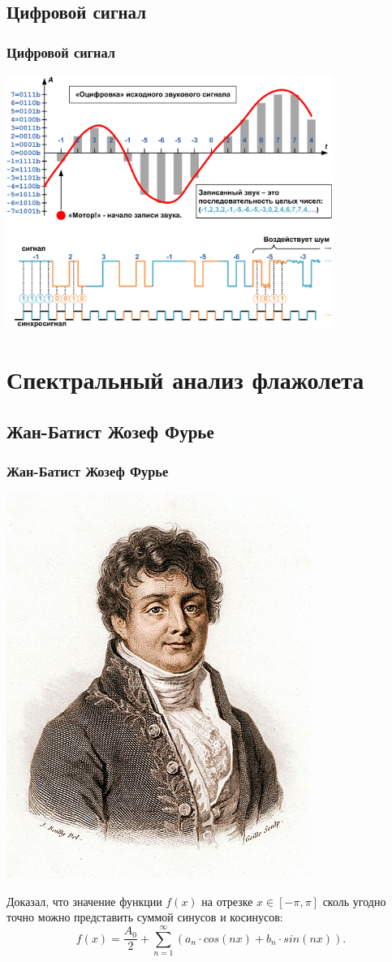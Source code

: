 \subsection{Цифровой сигнал}

\begin{frame}
    \frametitle{Цифровой сигнал}

    \begin{center}
        \includegraphics[width=0.8\textwidth]{figs/digital}
    \end{center}
\end{frame}


\section{Спектральный анализ флажолета}


\subsection{Жан-Батист Жозеф Фурье}

\begin{frame}
    \frametitle{Жан-Батист Жозеф Фурье}

    \begin{center}
        \includegraphics[width=.25\textwidth]{figs/fourier.jpg}
    \end{center}

	Доказал, что значение функции $f(x)$ на отрезке $x\in[-\pi,\pi]$ сколь угодно точно можно представить суммой синусов и косинусов:
	\[
		f(x)=\frac{A_0}{2}+\sum_{n=1}^{\infty}(a_n\cdot cos(nx) + b_n\cdot sin(nx)).
	\]
\end{frame}

